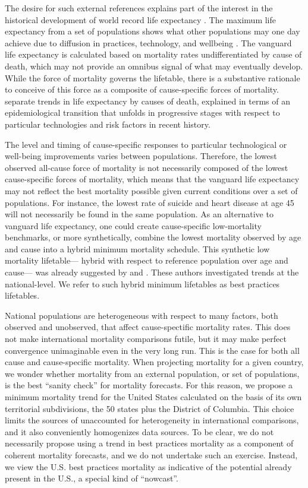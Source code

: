 \documentclass[11pt,oneside,a4paper]{article} %
\begin{document}
The desire for such external references explains part of the interest in the
historical development of world record life expectancy \citep{oeppen2002broken}.
The maximum life expectancy from a set of populations shows what other
populations may one day achieve due to diffusion in practices, technology, and
wellbeing \citep{vallin2010esperance}. The vanguard life expectancy is
calculated based on mortality rates undifferentiated by cause of death, which
may not provide an omnibus signal of what may eventually develop. While the force of
mortality governs the lifetable, there is a substantive rationale to conceive of
this force as a composite of cause-specific forces of mortality.
\citet{vallin2008minimum} separate trends in life expectancy by causes of death,
explained in terms of an epidemiological transition that unfolds in progressive
stages with respect to particular technologies and risk factors in recent
history. 

The level and timing of cause-specific responses to particular
technological or well-being improvements varies between populations. Therefore,
the lowest observed all-cause force of mortality is not necessarily composed of
the lowest cause-specific forces of mortality, which means that the vanguard life
expectancy may not reflect the best mortality possible given current conditions
over a set of populations. For instance, the lowest rate of suicide and heart
disease at age 45 will not necessarily be found in the same population. As an
alternative to vanguard life expectancy, one could create cause-specific
low-mortality benchmarks, or more synthetically, combine the lowest mortality
observed by age and cause into a hybrid minimum mortality schedule. This synthetic low mortality lifetable--- hybrid with respect to reference population over age and cause--- was already suggested by \citet{wunsch1975minimum} and \citet{vallin2008minimum}. These authors investigated trends at the national-level. We refer to such hybrid minimum
lifetables as best practices lifetables. 

National populations are heterogeneous with respect to many factors, both
observed and unobserved, that affect cause-spectific mortality rates. This does
not make international mortality comparisons futile, but it may make perfect
convergence unimaginable even in the very long run. This is the case for both
all cause and cause-specific mortality. When projecting mortality for a given country, we wonder whether mortality from an external population, or set of populations, is the best ``sanity
check'' for mortality forecasts.
For this reason, we propose a minimum mortality trend for the United States
calculated on the basis of its own territorial subdivisions, the 50 states plus
the District of Columbia. This choice limits the sources of unaccounted for
heterogeneity in international comparisons, and it also conveniently homogenizes
data sources. To be clear, we do not necessarily propose using a trend in best
practices mortality as a component of coherent mortality forecasts, and we do
not undertake such an exercise. Instead, we view the U.S. best practices
mortality as indicative of the potential already present in the U.S., a special
kind of ``nowcast''.
\end{document}
